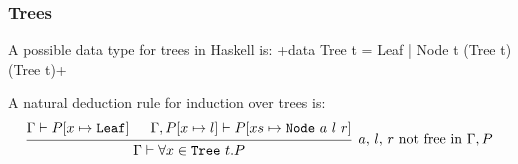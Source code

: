 \subsubsection{Trees}
A possible data type for trees in Haskell is:
+data Tree t = Leaf | Node t (Tree t) (Tree t)+

A natural deduction rule for induction over trees is:
\[
    \begin{prooftree}
        \hypo{\Gamma \vdash P[x \mapsto \texttt{Leaf}]}
        \hypo{\Gamma, P[x \mapsto l] \vdash P[xs \mapsto \texttt{Node}\ a\ l\ r]}
        \infer2[$a$, $l$, $r$ not free in $\Gamma, P$]{\Gamma \vdash \forall x \in \texttt{Tree}\ t. P}
    \end{prooftree}
\]

